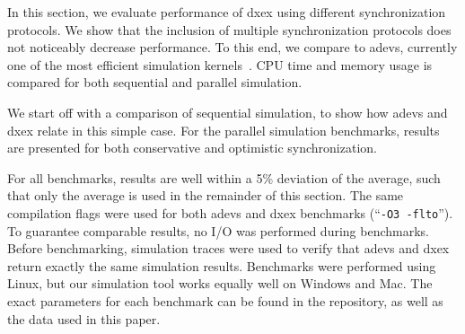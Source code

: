 \newcommand{\plotfraction}{0.88}

In this section, we evaluate performance of dxex using different synchronization protocols.
We show that the inclusion of multiple synchronization protocols does not noticeably decrease performance.
To this end, we compare to adevs, currently one of the most efficient simulation kernels~\cite{DEVSSurvey}.
CPU time and memory usage is compared for both sequential and parallel simulation.

We start off with a comparison of sequential simulation, to show how adevs and dxex relate in this simple case.
For the parallel simulation benchmarks, results are presented for both conservative and optimistic synchronization.

For all benchmarks, results are well within a 5\% deviation of the average, such that only the average is used in the remainder of this section.
The same compilation flags were used for both adevs and dxex benchmarks (``\texttt{-O3 -flto}'').
To guarantee comparable results, no I/O was performed during benchmarks.
Before benchmarking, simulation traces were used to verify that adevs and dxex return exactly the same simulation results.
Benchmarks were performed using Linux, but our simulation tool works equally well on Windows and Mac. The exact parameters for each benchmark can be found in the repository, as well as the data used in this paper. 

